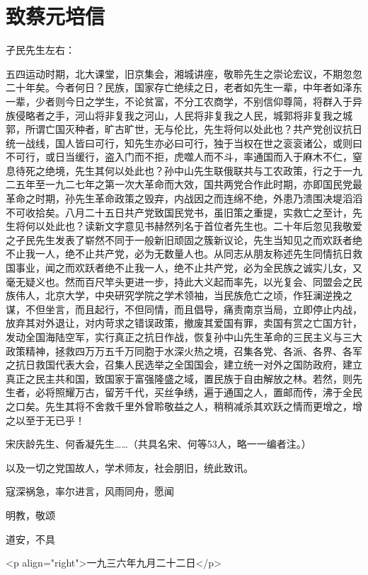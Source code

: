 \section[致蔡元培信（一九三六年九月二十六日）]{致蔡元培信}


孑民先生左右：

五四运动时期，北大课堂，旧京集会，湘城讲座，敬聆先生之崇论宏议，不期忽忽二十年矣。今者何日？民族，国家存亡绝续之日，老者如先生一辈，中年者如泽东一辈，少者则今日之学生，不论贫富，不分工农商学，不别信仰尊简，将群入于异族侵略者之手，河山将非复我之河山，人民将非复我之人民，城郭将非复我之城郭，所谓亡国灭种者，旷古旷世，无与伦比，先生将何以处此也？共产党创议抗日统一战线，国人皆曰可行，知先生亦必曰可行，独于当权在世之衮衮诸公，或则曰不可行，或日当缓行，盗入门而不拒，虎噬人而不斗，率通国而入于麻木不仁，窒息待死之绝境，先生其何以处此也？孙中山先生联俄联共与工农政策，行之于一九二五年至一九二七年之第一次大革命而大效，国共两党合作此时期，亦即国民党最革命之时期，孙先生革命政策之毁弃，内战因之而连绵不绝，外患乃溃围决堤滔滔不可收拾矣。八月二十五日共产党致国民党书，虽旧策之重提，实救亡之至计，先生将何以处此也？读新文字意见书赫然列名于首位者先生也。二十年后忽见我敬爱之孑民先生发表了崭然不同于一般新旧顽固之簇新议论，先生当知见之而欢跃者绝不止我一人，绝不止共产党，必为无数量人也。从同志从朋友称述先生同情抗日救国事业，闻之而欢跃者绝不止我一人，绝不止共产党，必为全民族之诚实儿女，又毫无疑义也。然而百尺竿头更进一步，持此大义起而率先，以光复会、同盟会之民族伟人，北京大学，中央研究学院之学术领袖，当民族危亡之顷，作狂澜逆挽之谋，不但坐言，而且起行，不但同情，而且倡导，痛责南京当局，立即停止内战，放弃其对外退让，对内苛求之错误政策，撤废其爱国有罪，卖国有赏之亡国方针，发动全国海陆空军，实行真正之抗日作战，恢复孙中山先生革命的三民主义与三大政策精神，拯救四万万五千万同胞于水深火热之境，召集各党、各派、各界、各军之抗日救国代表大会，召集人民选举之全国国会，建立统一对外之国防政府，建立真正之民主共和国，致国家于富强隆盛之域，置民族于自由解放之林。若然，则先生者，必将照耀万古，留芳千代，买丝争绣，遍于通国之人，置邮而传，沸于全民之口矣。先生其将不舍救千里外曾聆敬益之人，稍稍减杀其欢跃之情而更增之，增之以至于无已乎！

宋庆龄先生、何香凝先生……（共具名宋、何等53人，略一一编者注。）

以及一切之党国故人，学术师友，社会朋旧，统此致讯。

寇深祸急，率尔进言，风雨同舟，愿闻

明教，敬颂

道安，不具

<p align="right">一九三六年九月二十二日</p>

